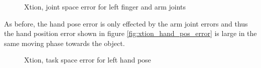 \begin{figure}
\centering
{}
%
\caption{Xtion, joint space error for left finger and arm joints}
\label{fig:xtion_joint_error}
\end{figure}

As before, the hand pose error is only effected by the arm joint errors and thus the hand position error shown in figure \ref{fig:xtion_hand_pos_error} is large in the same moving phase towards the object.

\begin{figure}
\centering
{}
%
\caption{Xtion, task space error for left hand pose}
\label{fig:xtion_hand_pose_error}
\end{figure}

